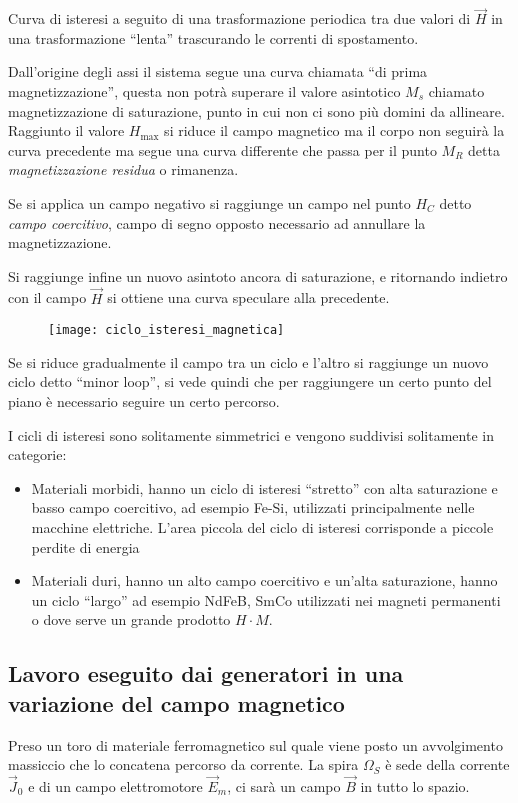 Curva di isteresi a seguito di una trasformazione periodica tra due valori di $\vec{H}$
in una trasformazione ``lenta'' trascurando le correnti di spostamento.

Dall'origine degli assi il sistema segue una curva chiamata ``di prima magnetizzazione'',
questa non potrà superare il valore asintotico $M_s$ chiamato magnetizzazione di 
saturazione, punto in cui non ci sono più domini da allineare. Raggiunto il valore $H_{\text{max}}$ si riduce il campo magnetico ma il corpo non seguirà la curva precedente 
ma segue una curva differente che passa per il punto $M_R$ detta 
\textit{magnetizzazione residua} o rimanenza.

Se si applica un campo negativo si raggiunge un campo nel punto $H_C$ detto \textit{campo 
coercitivo}, campo di segno opposto necessario ad annullare la magnetizzazione.

Si raggiunge infine un nuovo asintoto ancora di saturazione, e ritornando indietro
con il campo $\vec{H}$ si ottiene una curva speculare alla precedente.

\begin{figure}[H]
\centering
\texttt{[image: ciclo\_isteresi\_magnetica]}
\end{figure}

Se si riduce gradualmente il campo tra un ciclo e l'altro si raggiunge un nuovo ciclo detto
``minor loop'', si vede quindi che per raggiungere un certo punto del piano è necessario
seguire un certo percorso.

I cicli di isteresi sono solitamente simmetrici e vengono suddivisi solitamente
in categorie:
\begin{itemize}
\item Materiali morbidi, hanno un ciclo di isteresi ``stretto'' con alta saturazione e 
basso campo coercitivo, ad esempio Fe-Si, utilizzati principalmente nelle macchine
elettriche. L'area piccola del ciclo di isteresi corrisponde a piccole perdite di energia
\item Materiali duri, hanno un alto campo coercitivo e un'alta saturazione, hanno un ciclo
``largo'' ad esempio NdFeB, SmCo utilizzati nei magneti permanenti o dove serve 
un grande prodotto $H\cdot M$.
\end{itemize}

\subsection{Lavoro eseguito dai generatori in una variazione del campo magnetico}
Preso un toro di materiale ferromagnetico sul quale viene posto un avvolgimento massiccio 
che lo concatena percorso da corrente.
La spira $\Omega_S$ è sede della corrente $\vec{J}_0$ e di un campo elettromotore 
$\vec{E}_m$, ci sarà un campo $\vec{B}$ in tutto lo spazio.

